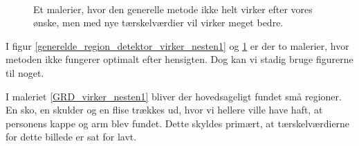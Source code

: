 \begin{figure}[!h]
    \centering
    \\
	\hspace{1em}
     \caption[]{Et malerier, hvor den generelle metode ikke helt virker efter vores ønske, men med nye tærskelværdier vil virker meget bedre.}
     \label{generelde_region_detektor_virker_nesten2}
\end{figure}

I figur \ref{generelde_region_detektor_virker_nesten1} og \ref{generelde_region_detektor_virker_nesten2} er der to
malerier, hvor metoden ikke fungerer optimalt efter hensigten. Dog kan
vi stadig bruge figurerne til noget.

I maleriet \ref{GRD_virker_nesten1} bliver der hovedsageligt fundet små
regioner. En sko, en skulder og en flise trækkes ud, hvor vi hellere
ville have haft, at personens kappe og arm blev fundet. Dette skyldes
primært, at tærskelværdierne for dette billede er sat for lavt. 


